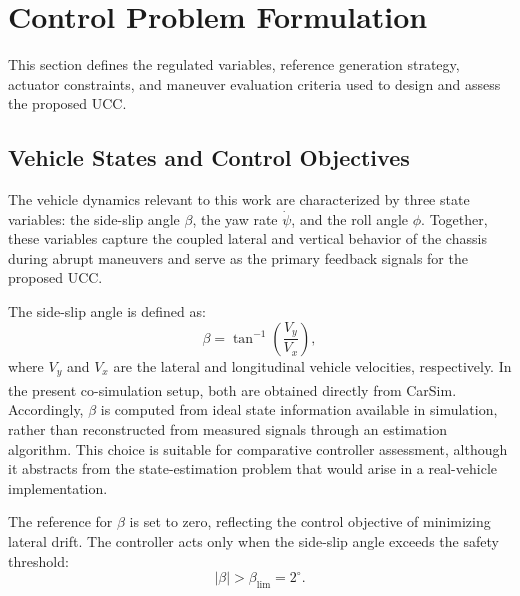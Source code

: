 \documentclass[sn-chicago,iicol]{sn-jnl}
\theoremstyle{thmstyleone}%
\theoremstyle{thmstyletwo}%
\theoremstyle{thmstylethree}%
\begin{document}

\section{Control Problem Formulation}\label{sec:problem}

This section defines the regulated variables, reference generation strategy, 
actuator constraints, and maneuver evaluation criteria used to design and 
assess the proposed UCC.

\subsection{Vehicle States and Control Objectives}\label{sec:states}

The vehicle dynamics relevant to this work are characterized by three state 
variables: the side-slip angle $\beta$, the yaw rate $\dot{\psi}$, and the 
roll angle $\phi$. Together, these variables capture the coupled lateral and 
vertical behavior of the chassis during abrupt maneuvers and serve as the 
primary feedback signals for the proposed UCC.

The side-slip angle is defined as:
\begin{equation}
    \beta = \tan^{-1}\left(\frac{V_y}{V_x}\right),
    \label{Eq:beta_def}
\end{equation}
where $V_y$ and $V_x$ are the lateral and longitudinal vehicle velocities, 
respectively. In the present co-simulation setup, both are obtained 
directly from CarSim\textsuperscript{\textregistered}. Accordingly, 
$\beta$ is computed from ideal state information available in simulation, 
rather than reconstructed from measured signals through an estimation 
algorithm. This choice is suitable for comparative controller assessment, 
although it abstracts from the state-estimation problem that would arise in 
a real-vehicle implementation.

The reference for $\beta$ is set to zero, reflecting the control objective 
of minimizing lateral drift. The controller acts only when the side-slip 
angle exceeds the safety threshold:
\begin{equation}
    |\beta| > \beta_{\mathrm{lim}} = 2^{\circ}.
    \label{Eq:beta_lim}
\end{equation}
\end{document}
